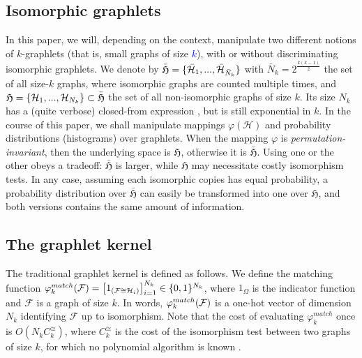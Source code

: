 \documentclass{article}
\newcommand\nt[1]{\textcolor{blue}{#1}}
\begin{document}
\subsection{Isomorphic graphlets}

In this paper, we will, depending on the context, manipulate two different notions of $k$-graphlets (that is, small graphs of size \nt{$k$}), with or without discriminating isomorphic graphlets. We denote by $\bar{\mathfrak{H}}=\{\bar{\mathcal{H}}_1,..., \bar{\mathcal{H}}_{\bar N_k}\}$ with $\bar{N}_k = 2^{\frac{k(k-1)}{2}}$ the set of all size-$k$ graphs, where isomorphic graphs are counted multiple times, and $\mathfrak{H}=\{\mathcal{H}_1,..., \mathcal{H}_{N_k}\} \subset \bar{\mathfrak{H}}$ the set of all non-isomorphic graphs of size $k$. Its size $N_k$ has a (quite verbose) closed-from expression \cite{oeid}, but is still exponential in $k$.
%
In the course of this paper, we shall manipulate mappings $\varphi(\mathcal{H})$ and probability distributions (histograms) over graphlets. When the mapping $\varphi$ is \emph{permutation-invariant}, then the underlying space is $\mathfrak{H}$, otherwise it is $\bar{\mathfrak{H}}$. Using one or the other obeys a tradeoff: $\bar{\mathfrak{H}}$ is larger, while $\mathfrak{H}$ may necessitate costly isomorphism tests. In any case, assuming each isomorphic copies has equal probability, a probability distribution over $\bar{\mathfrak{H}}$ can easily be transformed into one over $\mathfrak{H}$, and both versions contains the same amount of information.

\subsection{The graphlet kernel}

The traditional graphlet kernel is defined as follows. We define the matching function $\varphi_k^{match}(\mathcal{F}) = \left[ 1_{(\mathcal{F} \cong \mathcal{H}_i)}\right]_{i=1}^{N_k} \in \{0,1\}^{N_k}$, where $1_\Omega$ is the indicator function and $\mathcal{F}$ is a graph of size $k$. In words, $\varphi^{match}_k(\mathcal{F})$ is a one-hot vector of dimension $N_k$ identifying $\mathcal{F}$ up to isomorphism. Note that the cost of evaluating $\varphi_k^{match}$ once is $O\left(N_k C^{\cong}_k\right)$, where $C^{\cong}_k$ is the cost of the isomorphism test between two graphs of size $k$, for which no polynomial algorithm is known \cite{isomorphism_np}. 
\end{document}
